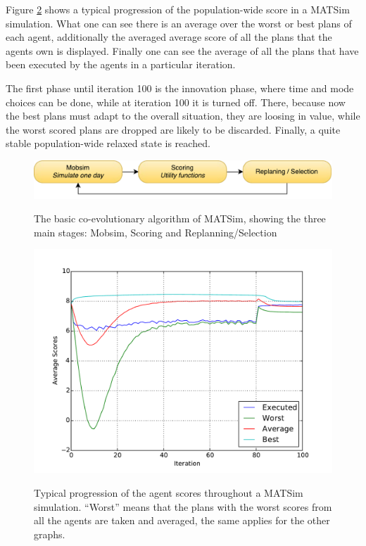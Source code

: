 Figure \ref{fig:scorestats} shows a typical progression of the population-wide
score in a MATSim simulation. What one can see there is an average over the worst
or best plans of each agent, additionally the averaged average score of all the
plans that the agents own is displayed. Finally one can see the average of all
the plans that have been executed by the agents in a particular iteration.

The first phase until iteration 100 is the innovation phase, where time and mode
choices can be done, while at iteration 100 it is turned off. There, because now
the best plans must adapt to the overall situation, they are loosing in value,
while the worst scored plans are dropped are likely to be discarded. Finally,
a quite stable population-wide relaxed state is reached.

\begin{figure}
\centering
\includegraphics[width=1.0\textwidth]{../matsimcycle.pdf}
\label{fig:matsimcycle}
\caption{The basic co-evolutionary algorithm of MATSim, showing the three main
stages: Mobsim, Scoring and Replanning/Selection}
\end{figure}

\begin{figure}
\centering
\includegraphics[width=1.0\textwidth]{../scorestats.pdf}
\label{fig:scorestats}
\caption{Typical progression of the agent scores throughout a MATSim simulation.
``Worst'' means that the plans with the worst scores from all the agents are taken
and averaged, the same applies for the other graphs.}
\end{figure}
